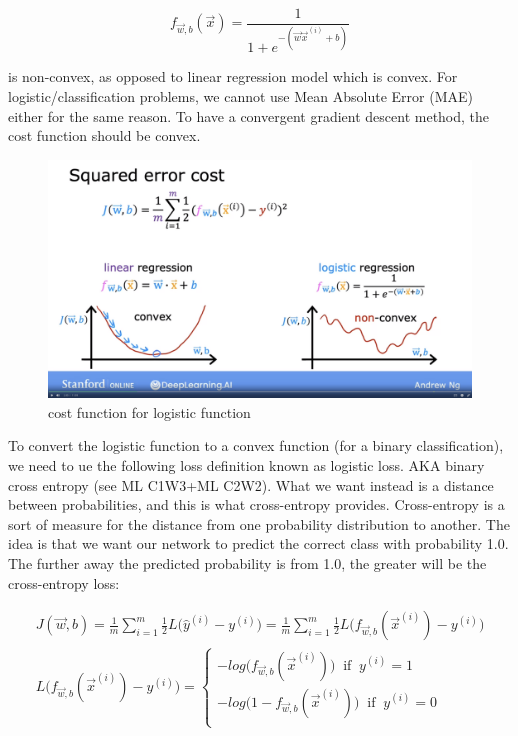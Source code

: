 \documentclass[12pt]{report}
\begin{document}
\begin{equation}
  f_{\overrightarrow{w},b} (\overrightarrow{x}) = \frac{1}{1+e^{-(\overrightarrow{w} \overrightarrow{x} ^ {(i)} + b)}}
\end{equation}

is non-convex, as opposed to linear regression model which is convex. For logistic/classification problems, we cannot use Mean Absolute Error (MAE) either for the same reason. To have a convergent gradient descent method, the cost function should be convex.

\begin{figure}[htbp]
  \begin{center}
    \includegraphics[trim =0cm 6.0cm 0cm 20.0cm, clip, scale=0.15]{pics/logistic.png}
    \caption{cost function for logistic function}
  \end{center}
\end{figure}

To convert the logistic function to a convex function (for a binary classification), we need to ue the following loss definition known as logistic loss. AKA binary cross entropy (see ML C1W3+ML C2W2). What we want instead is a distance between probabilities, and this is what cross-entropy provides. Cross-entropy is a sort of measure for the distance from one probability distribution to another. The idea is that we want our network to predict the correct class with probability 1.0. The further away the predicted probability is from 1.0, the greater will be the cross-entropy loss:

\begin{multline}
J(\overrightarrow{w},b) = \frac{1}{m} \sum_{i=1}^{m} \frac{1}{2}  L\big(\hat{y}^{(i)}  - y^{(i)} \big) = \frac{1}{m} \sum_{i=1}^{m} \frac{1}{2}  L\big(f_{\overrightarrow{w},b} (\overrightarrow{x}^{(i)})   - y^{(i)} \big)\\
L\big(f_{\overrightarrow{w},b} (\overrightarrow{x}^{(i)})   - y^{(i)} \big) =
\begin{cases}
  -log\big( f_{\overrightarrow{w},b} (\overrightarrow{x}^{(i)}) \big)  \;\; \text{if} \;\; y^{(i)} = 1  \\
  -log\big(1-f_{\overrightarrow{w},b} (\overrightarrow{x}^{(i)}) \big)  \;\; \text{if} \;\; y^{(i)} = 0  \\
\end{cases}
\end{multline}
\end{document}
